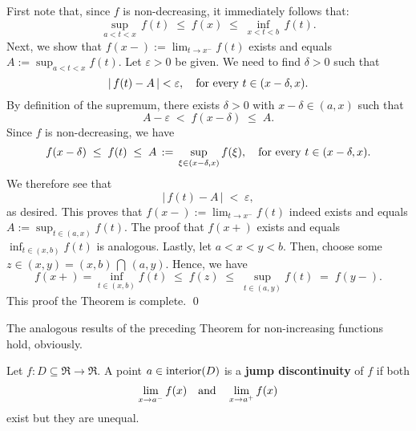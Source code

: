 \proof
First note that, since $f$ is non-decreasing, it immediately follows that:
\begin{equation*}
\sup_{a < t < x}\,f(t)
\;\leq\; f(x)
\;\leq\; \inf_{x < t < b}\,f(t).
\end{equation*}
Next, we show that $f(x-) := \lim_{t\rightarrow x^{-}}f(t)$ exists and equals $A := \sup_{a<t<x}f(t)$.
Let $\varepsilon > 0$ be given. We need to find $\delta > 0$ such that
\begin{equation*}
\vert\, f(t) - A \,\vert < \varepsilon,
\quad
\textnormal{for every $t \in (x-\delta,x)$}.
\end{equation*}
By definition of the supremum, there exists $\delta > 0$ with $x-\delta \in (a,x)$ such that
\begin{equation*}
A - \varepsilon \;<\; f(x-\delta) \;\leq\; A.
\end{equation*}
Since $f$ is non-decreasing, we have
\begin{equation*}
f(x-\delta) \; \leq \; f(t) \; \leq \; A \, := \, \sup_{\xi\in(x-\delta,x)}f(\xi),
\quad
\textnormal{for every $t \in (x-\delta,x)$}.
\end{equation*}
We therefore see that
\begin{equation*}
\vert\, f(t) - A \,\vert \; < \; \varepsilon,
\end{equation*}
as desired. This proves that $f(x-) := \lim_{t\rightarrow x^{-}}f(t)$ indeed exists and equals $A := \sup_{t\in(a,x)}f(t)$.
The proof that $f(x+)$ exists and equals $\inf_{t\in(x,b)}f(t)$ is analogous.
Lastly, let $a < x < y < b$. Then, choose some $z \in (x,y) = (x,b) \,\bigcap\, (a,y)$.
Hence, we have
\begin{equation*}
f(x+) = \inf_{t\in(x,b)}f(t)
\;\leq\; f(z)
\;\leq\; \sup_{t\in(a,y)}f(t)
\;=\; f(y-).
\end{equation*}
This proof the Theorem is complete.
\qed

\begin{remark}\quad
The analogous results of the preceding Theorem for non-increasing functions hold, obviously.
\end{remark}

\begin{definition}\quad
Let $f : D \subseteq \Re \longrightarrow \Re$.
A point $a \in \textnormal{interior}(D)$ is a \textbf{jump discontinuity} of $f$ if both
\begin{equation*}
\lim_{x \rightarrow a^{-}} f(x)
\quad\textnormal{and}\quad
\lim_{x \rightarrow a^{+}} f(x)
\end{equation*}
exist but they are unequal.
\end{definition}

